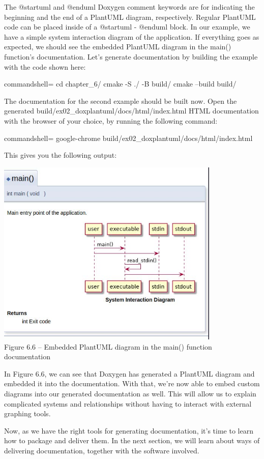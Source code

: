 The @startuml and @enduml Doxygen comment keywords are for indicating the beginning and the end of a PlantUML diagram, respectively. Regular PlantUML code can be placed inside of a @startuml - @enduml block. In our example, we have a simple system interaction diagram of the application. If everything goes as expected, we should see the embedded PlantUML diagram in the main() function's documentation. Let's generate documentation by building the example with the code shown here:
 
\begin{tcblisting}{commandshell={}}
cd chapter_6/
cmake -S ./ -B build/
cmake --build build/
\end{tcblisting}

The documentation for the second example should be built now. Open the generated build/ex02\_doxplantuml/docs/html/index.html HTML documentation with the browser of your choice, by running the following command:

\begin{tcblisting}{commandshell={}}
google-chrome build/ex02_doxplantuml/docs/html/index.html
\end{tcblisting}

This gives you the following output:

\begin{center}
\includegraphics[width=0.8\textwidth]{content/2/chapter6/images/6.jpg}\\
Figure 6.6 – Embedded PlantUML diagram in the main() function documentation
\end{center}

In Figure 6.6, we can see that Doxygen has generated a PlantUML diagram and embedded it into the documentation. With that, we're now able to embed custom diagrams into our generated documentation as well. This will allow us to explain complicated systems and relationships without having to interact with external graphing tools.

Now, as we have the right tools for generating documentation, it's time to learn how to package and deliver them. In the next section, we will learn about ways of delivering documentation, together with the software involved.









